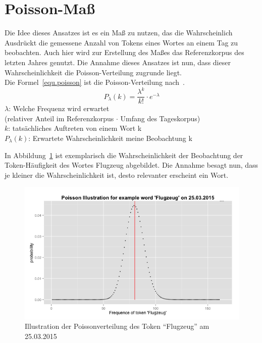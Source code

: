 \section{Poisson-Maß}\label{subsec.poisson}
Die Idee dieses Ansatzes ist es ein Maß zu nutzen, das die Wahrscheinlich Ausdrückt die gemessene Anzahl von Tokens eines Wortes an einem Tag zu beobachten. Auch hier wird zur Erstellung des Maßes das Referenzkorpus des letzten Jahres genutzt. Die Annahme dieses Ansatzes ist nun, dass dieser Wahrscheinlichkeit die Poisson-Verteilung zugrunde liegt.\\
Die Formel~\ref{equ.poisson} ist die Poisson-Verteilung nach~\cite[S. 338 ff]{heyer06}.
	\begin{equation}\label{equ.poisson}
	P_\lambda(k) = \frac{\lambda^{k}}{k!}  \cdot e^{-\lambda}
	\end{equation}
	$\lambda$: Welche Frequenz wird erwartet \\
	(relativer Anteil im Referenzkorpus $\cdot$ Umfang des Tageskorpus)\\
	$k$: tatsächliches Auftreten von einem Wort k\\
	$P_\lambda(k)$: Erwartete Wahrscheinlichkeit meine Beobachtung k


In Abbildung~\ref{pic.poisson_algemein} ist exemplarisch die Wahrscheinlichkeit der Beobachtung der Token-Häufigkeit des Wortes Flugzeug abgebildet. Die Annahme besagt nun, dass je kleiner die Wahrscheinlichkeit
ist, desto relevanter erscheint ein Wort.

\begin{figure}[h!]
    \centering
    \includegraphics[width=1\textwidth]{pictures/poissonVerteilungFlugzeug.png}
    \caption{Illustration der Poissonverteilung des Token \enquote{Flugzeug} am 25.03.2015}\label{pic.poisson_algemein}
\end{figure}

